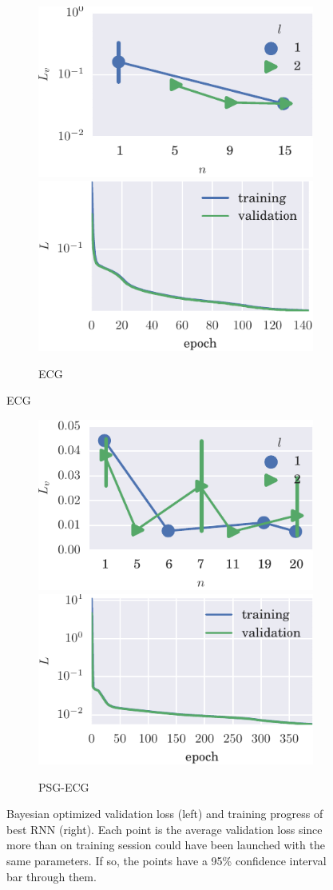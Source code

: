 \begin{figure}[!h]
\ContinuedFloat

    \begin{subfigure}[t]{\textwidth} 
        \includegraphics[width=.5\textwidth]{figs/bo_ecg.pdf}
        \includegraphics[width=.5\textwidth]{figs/trn_ecg.pdf}
        \caption{ECG}
    \end{subfigure}%

\end{figure}
\begin{figure}[!h]
\ContinuedFloat

    \begin{subfigure}[t]{\textwidth} 
        \includegraphics[width=.5\textwidth]{figs/bo_sleep.pdf}
        \includegraphics[width=.5\textwidth]{figs/trn_sleep.pdf}
        \caption{PSG-ECG}
    \end{subfigure}%


\caption[Training results]{Bayesian optimized validation loss (left) and training progress of best RNN (right).
%
Each point is the average validation loss since more than on training session could have been launched with the same parameters.
%
If so, the points have a 95\% confidence interval bar through them.
} 
\label{fig:bo} %
\end{figure}



